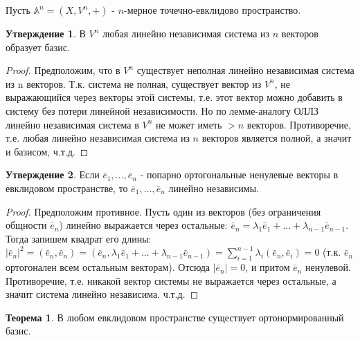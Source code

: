 \documentclass[a4paper, 12pt]{article}
\theoremstyle{definition}
\newtheorem*{theorem}{Теорема}
\newtheorem*{subtheorem}{Утверждение}
\begin{document}
	Пусть $\mathbb{A}^n = (X, V^n, +)$ - $n$-мерное точечно-евклидово пространство.
	\begin{subtheorem}
		В $V^n$ любая линейно независимая система из $n$ векторов образует базис.
	\end{subtheorem}
	\begin{proof}
		Предположим, что в $V^n$ существует неполная линейно независимая система из n векторов. Т.к. система не полная, существует вектор из $V^n$, не выражающийся через векторы этой системы, т.е. этот вектор можно добавить в систему без потери линейной независимости. Но по лемме-аналогу ОЛЛЗ линейно независимая система в $V^n$ не может иметь $> n$ векторов. Противоречие, т.е. любая линейно независимая система из $n$ векторов является полной, а значит и базисом, ч.т.д. 
	\end{proof}
	\begin{subtheorem}
		Если $\bar{e}_{1},...,\bar{e}_{n}$ - попарно ортогональные ненулевые векторы в евклидовом пространстве, то $\bar{e}_{1},...,\bar{e}_{n}$ линейно независимы.
	\end{subtheorem}
	\begin{proof}
		Предположим противное. Пусть один из векторов (без ограничения общности $\bar{e}_{n}$) линейно выражается через остальные: $\bar{e}_{n} = \lambda_{1}\bar{e}_{1} +...+ \lambda_{n-1}\bar{e}_{n-1}$. Тогда запишем квадрат его длины:
		$|\bar{e}_{n}|^2 = (\bar{e}_{n}, \bar{e}_{n}) = (\bar{e}_{n}, \lambda_{1}\bar{e}_{1} +...+ \lambda_{n-1}\bar{e}_{n-1}) = \sum \limits_{i=1}^{n-1} \lambda_{i}(\bar{e}_{n}, \bar{e}_{i}) = 0$ (т.к. $\bar{e}_{n}$ ортогонален всем остальным векторам). Отсюда $|\bar{e}_{n}| = 0$, и притом $\bar{e}_{n}$ ненулевой. Противоречие, т.е. никакой вектор системы не выражается через остальные, а значит система линейно независима. ч.т.д.
	\end{proof}
	\begin{theorem}
		В любом евклидовом пространстве существует ортонормированный базис.
	\end{theorem}
\end{document}
